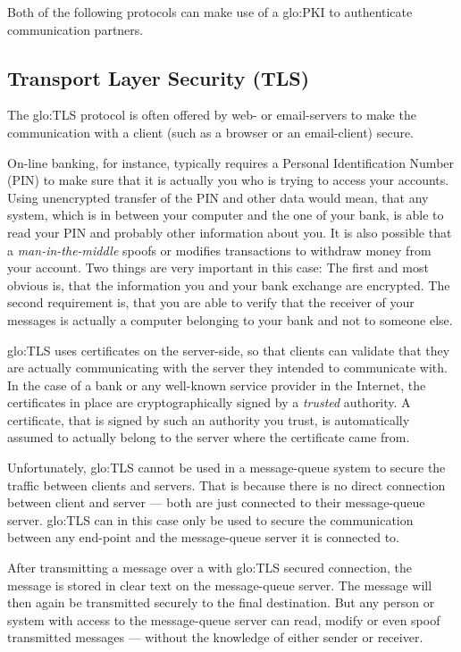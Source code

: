\bigskip

Both  of  the following  protocols  can make  use  of  a \gls{glo:PKI}  to
authenticate communication partners.

\subsection{Transport Layer Security (TLS)}

The \gls{glo:TLS}  protocol is often  offered by web- or  email-servers to
make  the  communication   with  a  client  (such  as   a  browser  or  an
email-client) secure.

On-line   banking,   for   instance,   typically   requires   a   Personal
Identification Number  (PIN) to make sure  that it is actually  you who is
trying to access your accounts.  Using unencrypted transfer of the PIN and
other data would mean, that any  system, which is in between your computer
and the  one of your  bank, is  able to read  your PIN and  probably other
information about you. It is also possible that a \emph{man-in-the-middle}
spoofs or modifies  transactions to withdraw money from  your account. Two
things are  very important in  this case: The  first and most  obvious is,
that the information you and  your bank exchange are encrypted. The second
requirement is,  that you  are able  to verify that  the receiver  of your
messages is actually a computer belonging  to your bank and not to someone
else.

\gls{glo:TLS} uses  certificates on the  server-side, so that  clients can
validate  that  they  are  actually  communicating with  the  server  they
intended to  communicate with.  In  the case of  a bank or  any well-known
service  provider   in  the  Internet,  the  certificates   in  place  are
cryptographically  signed by a  \emph{trusted} authority.   A certificate,
that is signed by such an authority you trust, is automatically assumed to
actually belong to the server where the certificate came from.

\bigskip

Unfortunately, \gls{glo:TLS}  cannot be used in a  message-queue system to
secure the traffic  between clients and servers. That  is because there is
no direct connection between client and server --- both are just connected
to their message-queue server. \gls{glo:TLS} can in this case only be used
to secure  the communication between  any end-point and  the message-queue
server it  is connected to.

After transmitting a message over a with \gls{glo:TLS} secured connection,
the  message is  stored in  clear text  on the  message-queue  server. The
message   will  then   again  be   transmitted  securely   to   the  final
destination. But  any person  or system with  access to  the message-queue
server can read, modify or even spoof transmitted messages --- without the
knowledge of either sender or receiver.

